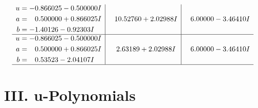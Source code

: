 \documentclass[1p]{elsarticle_modified}
\theoremstyle{definition}
\begin{document}
$$\begin{array}{c|c|c}
\begin{aligned}
u &= -0.866025 - 0.500000 I \\
a &= \phantom{-}0.500000 + 0.866025 I \\
b &= -1.40126 - 0.92303 I\end{aligned}
 & \phantom{-}10.52760 + 2.02988 I & \phantom{-}6.00000 - 3.46410 I \\ \hline\begin{aligned}
u &= -0.866025 - 0.500000 I \\
a &= \phantom{-}0.500000 + 0.866025 I \\
b &= \phantom{-}0.53523 - 2.04107 I\end{aligned}
 & \phantom{-}2.63189 + 2.02988 I & \phantom{-}6.00000 - 3.46410 I\\
 \hline 
 \end{array}$$\newpage
\newpage\renewcommand{\arraystretch}{1}
\centering \section*{ III. u-Polynomials}
\end{document}
